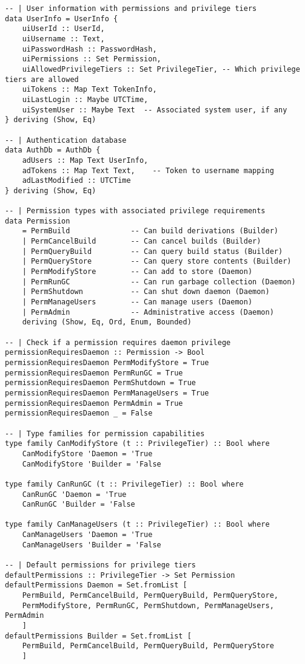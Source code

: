 \documentclass{article}
\begin{document}
\begin{tcolorbox}[title=Ten/Daemon/Auth.hs Changes]
\begin{verbatim}
-- | User information with permissions and privilege tiers
data UserInfo = UserInfo {
    uiUserId :: UserId,
    uiUsername :: Text,
    uiPasswordHash :: PasswordHash,
    uiPermissions :: Set Permission,
    uiAllowedPrivilegeTiers :: Set PrivilegeTier, -- Which privilege tiers are allowed
    uiTokens :: Map Text TokenInfo,
    uiLastLogin :: Maybe UTCTime,
    uiSystemUser :: Maybe Text  -- Associated system user, if any
} deriving (Show, Eq)

-- | Authentication database
data AuthDb = AuthDb {
    adUsers :: Map Text UserInfo,
    adTokens :: Map Text Text,    -- Token to username mapping
    adLastModified :: UTCTime
} deriving (Show, Eq)

-- | Permission types with associated privilege requirements
data Permission
    = PermBuild              -- Can build derivations (Builder)
    | PermCancelBuild        -- Can cancel builds (Builder)
    | PermQueryBuild         -- Can query build status (Builder)
    | PermQueryStore         -- Can query store contents (Builder)
    | PermModifyStore        -- Can add to store (Daemon)
    | PermRunGC              -- Can run garbage collection (Daemon)
    | PermShutdown           -- Can shut down daemon (Daemon)
    | PermManageUsers        -- Can manage users (Daemon)
    | PermAdmin              -- Administrative access (Daemon)
    deriving (Show, Eq, Ord, Enum, Bounded)

-- | Check if a permission requires daemon privilege
permissionRequiresDaemon :: Permission -> Bool
permissionRequiresDaemon PermModifyStore = True
permissionRequiresDaemon PermRunGC = True
permissionRequiresDaemon PermShutdown = True
permissionRequiresDaemon PermManageUsers = True
permissionRequiresDaemon PermAdmin = True
permissionRequiresDaemon _ = False

-- | Type families for permission capabilities
type family CanModifyStore (t :: PrivilegeTier) :: Bool where
    CanModifyStore 'Daemon = 'True
    CanModifyStore 'Builder = 'False

type family CanRunGC (t :: PrivilegeTier) :: Bool where
    CanRunGC 'Daemon = 'True
    CanRunGC 'Builder = 'False

type family CanManageUsers (t :: PrivilegeTier) :: Bool where
    CanManageUsers 'Daemon = 'True
    CanManageUsers 'Builder = 'False

-- | Default permissions for privilege tiers
defaultPermissions :: PrivilegeTier -> Set Permission
defaultPermissions Daemon = Set.fromList [
    PermBuild, PermCancelBuild, PermQueryBuild, PermQueryStore,
    PermModifyStore, PermRunGC, PermShutdown, PermManageUsers, PermAdmin
    ]
defaultPermissions Builder = Set.fromList [
    PermBuild, PermCancelBuild, PermQueryBuild, PermQueryStore
    ]


\end{verbatim}
\end{tcolorbox}
\end{document}
